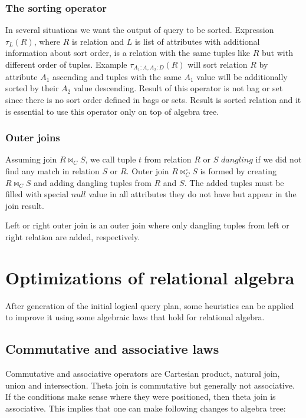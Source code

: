 \subsubsection{The sorting operator}

In several situations we want the output of query to be sorted. Expression $\tau_L(R)$, where $R$ is relation and $L$ is list of attributes with additional information about sort order, is a relation with the same tuples like $R$ but with  different order of tuples. Example $\tau_{A_1:A,A_2:D}(R)$ will sort relation $R$ by attribute $A_1$ ascending and tuples with the same $A_1$ value will be additionally sorted by their $A_2$ value descending. Result of this operator is not bag or set  since there is no sort order defined in bags or sets. Result is sorted relation and it is essential to use this operator only on top of algebra tree.

\subsubsection{Outer joins}
Assuming join $R\Join_C S$, we call tuple $t$ from relation $R$ or $S$ $dangling$ if
we did not find any match in relation $S$ or $R$. Outer join $R\Join^\circ_C S$ is formed by creating $R\Join_C S$ and adding dangling tuples from $R$ and $S$. The added tuples must be filled with special $null$ value in all attributes they do not have but appear in the join result.

Left or right outer join is an outer join where only dangling tuples from left or right relation are added, respectively.

\section{Optimizations of relational algebra}

After generation of the initial logical query plan, some heuristics can be applied to improve it using some algebraic laws that hold for relational algebra. 


\subsection{Commutative and associative laws}
Commutative and associative operators are Cartesian product, natural join, union and intersection. Theta join is commutative but generally not associative. If the conditions make sense where they were positioned, then theta join is associative.
This implies that one can make following changes to algebra tree:

